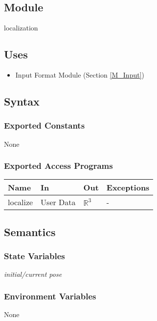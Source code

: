 \documentclass[12pt, titlepage]{article}
\begin{document}
\subsection{Module}

localization

\subsection{Uses}
\begin{itemize}
  \item Input Format Module (Section \ref{M_Input})
  
\end{itemize}
\subsection{Syntax}

\subsubsection{Exported Constants}
None

\subsubsection{Exported Access Programs}

\begin{center}
\begin{tabular}{p{2cm} p{4cm} p{4cm} p{2cm}}
\hline
\textbf{Name} & \textbf{In} & \textbf{Out} & \textbf{Exceptions} \\
\hline
localize & User Data & $\mathbb{R}^3$ & - \\
\hline
\end{tabular}
\end{center}

\subsection{Semantics}

\subsubsection{State Variables}
\textit{initial/current pose}

\subsubsection{Environment Variables}
None
\end{document}
